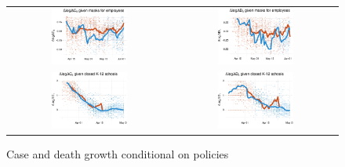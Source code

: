 \documentclass[3p, longtitle]{elsarticle}
\theoremstyle{definition}
\begin{document}
\begin{figure}
  \caption{Case and death growth conditional on policies \label{fig:growthpolicies1}}
  \begin{minipage}{\linewidth}
    \centering
    \begin{tabular}{cc}
      \includegraphics[width=0.483\textwidth]{tables_and_figures/pmaskbus-cases-14}
      &
        \includegraphics[width=0.483\textwidth]{tables_and_figures/pmaskbus-deaths-21}
      \\
      \includegraphics[width=0.483\textwidth]{tables_and_figures/pk12-cases-14}
      &
        \includegraphics[width=0.483\textwidth]{tables_and_figures/pk12-deaths-21}

\end{tabular}
\end{minipage}
\end{figure}
\end{document}
